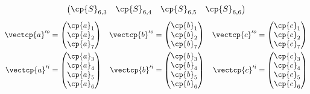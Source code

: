 \begin{refsection}
\begin{equation}
\begin{aligned}
\begin{pmatrix}
        \cp{S}_{6,3} & \cp{S}_{6,4} & \cp{S}_{6,5} & \cp{S}_{6,6} \\
    \end{pmatrix}
    \end{aligned}
    \label{eq:q_s_qtranspose_sprime_decomposed}
\end{equation}
\begin{equation}
    \begin{aligned}
        \vectcp{a}'^o &= \begin{pmatrix}\cp{a}_1\\\cp{a}_2\\\cp{a}_7\end{pmatrix}
        &
        \vectcp{b}'^o &= \begin{pmatrix}\cp{b}_1\\\cp{b}_2\\\cp{b}_7\end{pmatrix}
        &
        \vectcp{c}'^o &= \begin{pmatrix}\cp{c}_1\\\cp{c}_2\\\cp{c}_7\end{pmatrix}
        \\
        \vectcp{a}'^i &= \begin{pmatrix}\cp{a}_3\\\cp{a}_4\\\cp{a}_5\\\cp{a}_6\end{pmatrix}
        &
        \vectcp{b}'^i &= \begin{pmatrix}\cp{b}_3\\\cp{b}_4\\\cp{b}_5\\\cp{b}_6\end{pmatrix}
        &
        \vectcp{c}'^i &= \begin{pmatrix}\cp{c}_3\\\cp{c}_4\\\cp{c}_5\\\cp{c}_6\end{pmatrix}
    \end{aligned}
    \label{eq:qa_qb_qc_decomposed}
\end{equation}


\end{refsection}
